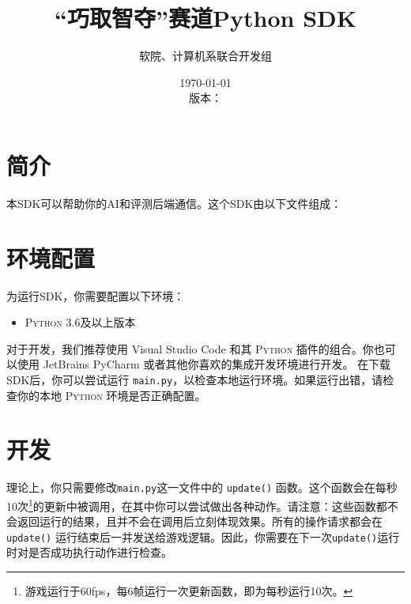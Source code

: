 \documentclass{article}
\title{“巧取智夺”赛道Python SDK}
\author{软院、计算机系联合开发组}
\date{\today\\版本：\gitAbbrevHash}
\begin{document}
\maketitle

\section{简介}

本SDK可以帮助你的AI和评测后端通信。这个SDK由以下文件组成：


\section{环境配置}

为运行SDK，你需要配置以下环境：
	\begin{itemize}\setlength\itemsep{0em}
		\item \textsc{Python} 3.6及以上版本
	\end{itemize}
	对于开发，我们推荐使用 Visual Studio Code 和其 \textsc{Python} 插件的组合。你也可以使用 JetBrains PyCharm 或者其他你喜欢的集成开发环境进行开发。
	在下载SDK后，你可以尝试运行 \texttt{main.py}，以检查本地运行环境。如果运行出错，请检查你的本地 \textsc{Python} 环境是否正确配置。

\section{开发}

理论上，你只需要修改\texttt{main.py}这一文件中的 \texttt{update()} 函数。这个函数会在每秒10次\footnote{游戏运行于60fps，每6帧运行一次更新函数，即为每秒运行10次。}的更新中被调用，在其中你可以尝试做出各种动作。请注意：这些函数都不会返回运行的结果，且并不会在调用后立刻体现效果。所有的操作请求都会在 \texttt{update()} 运行结束后一并发送给游戏逻辑。因此，你需要在下一次\texttt{update()}运行时对是否成功执行动作进行检查。
\end{document}
